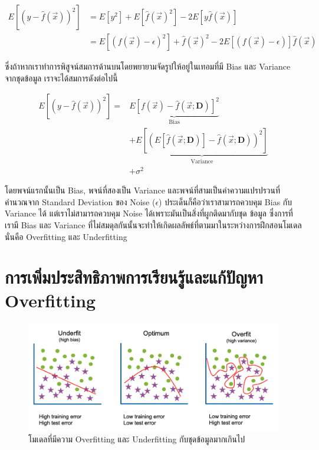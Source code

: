 \begin{align}
    E\left[\left(y - \hat{f}(\vec{x})\right)^2\right] &= 
    E\left[y^2\right] + E\left[\hat{f}(\vec{x})^2\right] - 2 E\left[y\hat{f}(\vec{x})\right] \\
    &= E\left[\left(f(\vec{x}) - \epsilon\right)^2\right] + \hat{f}(\vec{x})^2 - 2 E\left[\left(f(\vec{x}) - 
    \epsilon\right)\right]\hat{f}(\vec{x})
\end{align}

\noindent ซึ่งถ้าหากเราทำการพิสูจน์สมการด้านบนโดยพยายามจัดรูปให้อยู่ในเทอมที่มี Bias และ Variance จากชุดข้อมูล เราจะได้สมการดังต่อไปนี้

\begin{align}\label{eq:bias_variance}
E\left[\left(y - \hat{f}(\vec{x})\right)^2\right] = 
    & \underbrace{E\left[f(\vec{x}) - \hat{f}\left(\vec{x}; \mathbf{D}\right)\right]^2}_{\text{Bias}} \nonumber \\
    & + \underbrace{E\left[\left(E\left[\hat{f}\left(\vec{x}; \mathbf{D}\right)\right] - 
    \hat{f}\left(\vec{x}; \mathbf{D}\right)\right)^2\right]}_{\text{Variance}} \nonumber \\
    & + \sigma^2
\end{align}

โดยพจน์แรกนั้นเป็น Bias, พจน์ที่สองเป็น Variance และพจน์ที่สามเป็นค่าความแปรปรวนที่คำนวณจาก Standard Deviation ของ Noise 
($\epsilon$) ประเด็นก็คือว่าเราสามารถควบคุม Bias กับ Variance ได้ แต่เราไม่สามารถควบคุม Noise ได้เพราะมันเป็นสิ่งที่ผูกติดมากับชุด%
ข้อมูล ซึ่งการที่เรามี Bias และ Variance ที่ไม่สมดุลกันนั้นจะทำให้เกิดผลลัพธ์ที่ตามมาในระหว่างการฝึกสอนโมเดล นั่นคือ Overfitting และ 
Underfitting

\section{การเพิ่มประสิทธิภาพการเรียนรู้และแก้ปัญหา Overfitting}
\label{sec:fix_overfit}

\begin{figure}[htbp]
    \centering
    \includegraphics[width=0.9\linewidth]{fig/overfitting.png}
    \caption{โมเดลที่มีความ Overfitting และ Underfitting กับชุดข้อมูลมากเกินไป}
    \label{fig:overfitting}
\end{figure}

